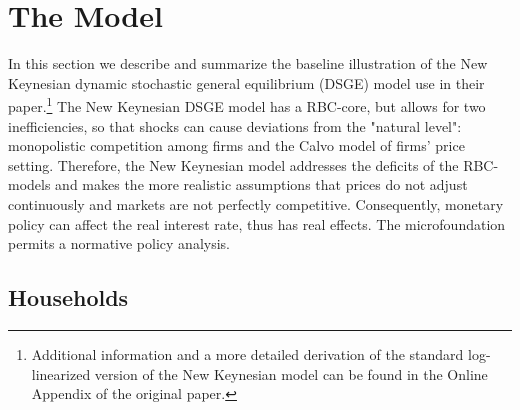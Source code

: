 \documentclass[12pt,a4paper,oneside,titlepage]{article}
\begin{document}
\section{The Model}
In this section we describe and summarize the baseline illustration of the New Keynesian dynamic stochastic general equilibrium (DSGE) model \citet{Erceg.2014} use in their paper.\footnote {Additional information and a more detailed derivation of the standard log-linearized version of the New Keynesian model can be found in the Online Appendix of the original paper.} The New Keynesian DSGE model has a RBC-core, but allows for two inefficiencies, so that shocks can cause deviations from the "natural level": monopolistic competition among firms and the Calvo model of firms' price setting. Therefore, the New Keynesian model addresses the deficits of the RBC-models and makes the more realistic assumptions that prices do not adjust continuously and markets are not perfectly competitive. Consequently, monetary policy can affect the real interest rate, thus has real effects. The microfoundation permits a normative policy analysis.
\subsection*{Households}
\end{document}
